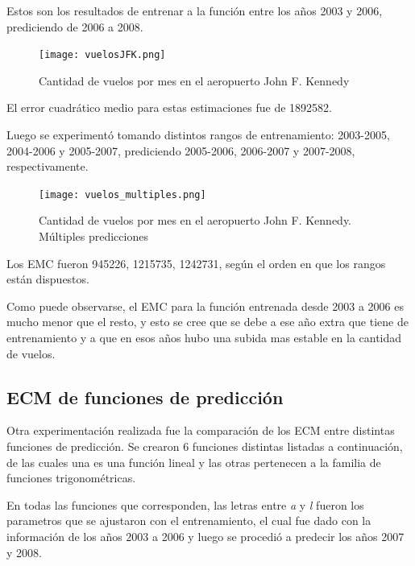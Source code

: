 Estos son los resultados de entrenar a la función entre los años 2003 y 2006, prediciendo de 2006 a 2008.

\begin{figure}[!htb]
\begin{center}
\texttt{[image: vuelosJFK.png]}
\caption{Cantidad de vuelos por mes en el aeropuerto John F. Kennedy}
\label{vuelos-1}
\end{center}
\end{figure}

El error cuadrático medio para estas estimaciones fue de 1892582.

Luego se experimentó tomando distintos rangos de entrenamiento: 2003-2005, 2004-2006 y 2005-2007, prediciendo 2005-2006, 2006-2007 y 2007-2008, respectivamente.

\begin{figure}[!htb]
\begin{center}
\texttt{[image: vuelos\_multiples.png]}
\caption{Cantidad de vuelos por mes en el aeropuerto John F. Kennedy. Múltiples predicciones}
\label{vuelos-2}
\end{center}
\end{figure}


Los EMC fueron 945226, 1215735, 1242731, según el orden en que los rangos están dispuestos.

Como puede observarse, el EMC para la función entrenada desde 2003 a 2006 es mucho menor que el resto, y esto se cree que se debe a ese año extra que tiene de entrenamiento y a que en esos años hubo una subida mas estable en la cantidad de vuelos.


\subsection{ECM de funciones de predicción}

Otra experimentación realizada fue la comparación de los ECM entre distintas funciones de predicción. Se crearon 6 funciones distintas listadas a continuación, de las cuales una es una función lineal y las otras pertenecen a la familia de funciones trigonométricas.

En todas las funciones que corresponden, las letras entre \textit{a} y \textit{l} fueron los parametros que se ajustaron con el entrenamiento, el cual fue dado con la información de los años 2003 a 2006 y luego se procedió a predecir los años 2007 y 2008.

